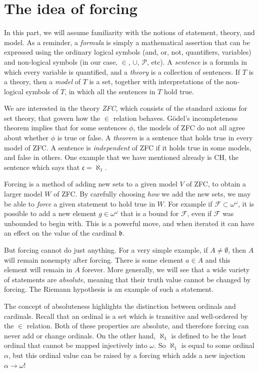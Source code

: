 \documentclass[11pt,oneside]{amsbook}
\theoremstyle{definition}
\theoremstyle{plain}
\theoremstyle{definition}
\theoremstyle{remark}
\begin{document}
\section{The idea of forcing}
\label{sec:idea-forcing}

In this part, we will assume familiarity with the notions of statement, theory, and model. As a reminder, a \emph{formula} is simply a mathematical assertion that can be expressed using the ordinary logical symbols (and, or, not, quantifiers, variables) and non-logical symbols (in our case, $\in$, $\cup$, $\mathcal P$, etc). A \emph{sentence} is a formula in which every variable is quantified, and a \emph{theory} is a collection of sentences. If $T$ is a theory, then a \emph{model} of $T$ is a set, together with interpretations of the non-logical symbols of $T$, in which all the sentences in $T$ hold true.

We are interested in the theory \emph{ZFC}, which consists of the standard axioms for set theory, that govern how the $\in$ relation behaves. G\"odel's incompleteness theorem implies that for some sentences $\phi$, the models of ZFC do not all agree about whether $\phi$ is true or false. A \emph{theorem} is a sentence that holds true in every model of ZFC. A sentence is \emph{independent} of ZFC if it holds true in some models, and false in others. One example that we have mentioned already is CH, the sentence which says that $\mathfrak c=\aleph_1$.

Forcing is a method of adding new sets to a given model $V$ of ZFC, to obtain a larger model $W$ of ZFC. By carefully choosing \emph{how} we add the new sets, we may be able to \emph{force} a given statement to hold true in $W$. For example if $\mathcal F\subset\omega^\omega$, it is possible to add a new element $g\in\omega^\omega$ that is a bound for $\mathcal F$, even if $\mathcal F$ was unbounded to begin with. This is a powerful move, and when iterated it can have an effect on the value of the cardinal $\mathfrak b$.

But forcing cannot do just anything. For a very simple example, if $A\neq\emptyset$, then $A$ will remain nonempty after forcing. There is some element $a\in A$ and this element will remain in $A$ forever. More generally, we will see that a wide variety of statements are \emph{absolute}, meaning that their truth value cannot be changed by forcing. The Riemann hypothesis is an example of such a statement.

The concept of absoluteness highlights the distinction between ordinals and cardinals. Recall that an ordinal is a set which is transitive and well-ordered by the $\in$ relation. Both of these properties are absolute, and therefore forcing can never add or change ordinals. On the other hand, $\aleph_1$ is defined to be the least ordinal that cannot be mapped injectively into $\omega$. So $\aleph_1$ is equal to some ordinal $\alpha$, but this ordinal value can be raised by a forcing which adds a new injection $\alpha\to\omega$!
\end{document}
